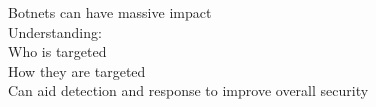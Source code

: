 \documentclass[preview]{standalone}
\begin{document}
Botnets can have massive impact\\Understanding:\\   Who is targeted\\   How they are targeted\\Can aid detection and response to improve overall security\\
\end{document}
